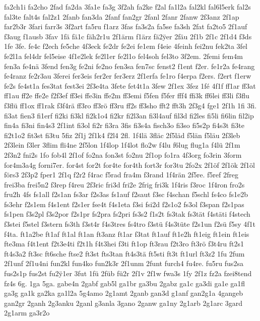 {fa2ch1i
fa2cho
2fad
fa2da
3fa1e
fa3g
3f2ah
fa2ke
f2al
fa1l2a
fal2kl
fal6l5erk
fal2s
fal3te
falt4s
fal2z1
2fanb
fan3da
2fanf
fan2gr
2fanl
2fanr
2fanw
2f3anz
2f1ap
far2b3r
3fari
farr3s
3f2art
fa5ru
f1arz
3fas
fa3s2a
fa5se
fa3sh
2fat
fa2to5
2f1auf
f3aug
f1ausb
3fav
1fä
fä1c
fäh2r1u
2f1ärm
f1ärz
fä2^^ffer
2fäu
2f1b
2f1c
2f1d4
f3ds
1fe
3fe.
fe4c
f2ech
fe5che
4f3eck
fe2dr
fe2ei
fe1em
f4eie
4feinh
fei2nu
fek2ta
3fel
fe2l1a
fel4dr
fel5eise
4f1e2lek
fe2l1er
fe2l1o
fel4soh
fel3to
3f2em.
2femi
fem4m
fen3a
fe4nä
3fend
fen3g
fe2ni
fe2no
fen3sa
fen7sc
fenst2
f1ent
f2er.
fe1r2a
fe4rang
fe4ranz
fe2r3au
3ferei
fer3eis
fer2er
fer3erz
2f1erfa
fe1ro
f4erpa
f2ers.
f2ert
f1erw
fe2s
fe4st1a
fes3tat
fest3ei
2f3e4ta
3fete
fet4t1a
3few
2f1ex
3fez
1fé
4f1f
ff1ar
ff3at
ff1au
ff2e
ffe2e
f2f3ef
ff3ei
ffe3in
ffe2m
ff3emi
f5fen
f5fer
fff4
ffi3k
ff6lei
ff3li
f3flu
f3flü
ff1ox
ff1rak
f3f4rä
ff3ro
ff3rö
ff3ru
ff2s
ff3sho
fft2
fft3h
2f3g4
fge1
2f1h
1fi
3fi.
fi3at
fien3
fi1erf
fi2ki
fi3kl
fi2k1o4
fi2kr
fi2l3an
fi3l4auf
fil3d
fi2les
fi5li
fi6lin
fil2ip
fin4a
fi3ni
fin4s3
2f1int
fi3ol
fi2r
fi3ra
3fis
fi3s4a
fisch3o
fi3so
fi5s2p
fi4s3t
fi3te
fi2t1o2
fit3st
fi3tu
5fiz
2f1j
2f1k4
f2l4
2fl.
1f4lä
3fläc
2f5läd
f5län
f5läu
2f3leb
2f3lein
f3ler
3flim
fli4ne
2f5lon
1f4lop
1f4lot
flo2w
f4lu
f6lug
flug1a
f4lü
2f1m
2f3n2
fni2s
1fo
fob4l
2f1of
fo2na
fon3st
fo2nu
2f1op
fo1ra
4f3org
fo3rin
3form
for4m3a4g
forni7er.
for4st
for2t
for4te
for4th
fort3r
for3tu
2fo2x
2f1öf
2f1ök
2f1öl
förs3
2f3p2
fper1
2f1q
f2r2
f4rac
f5rad
fra4m
f3rand
1f4rän
2f5re.
f5ref
2freg
frei3ba
frei5n2
f3rep
f4reu
2f3ric
fri3d
fri2e
2frig
fri3k
1f4ris
f3roc
1f4ron
fro2s
fru2h
4fs
fs1all
f2s1an
fs3ar
f2s3as
fs1auf
f2saut
f3sc
f4schan
f5schl
fs4co
fs1e2b
fs3ehr
f2s1em
f4s1ent
f2s1er
fse4t
f4s1eta
f3si
fsi2d
f2s1o2
fs3ol
f3span
f2s1pas
fs1pen
f3s2pl
f3s2por
f2s1pr
fs2pra
fs2pri
fs3s2
f1s2t
fs3tak
fs3tät
f4stäti
f4stech
f3stei
f5stel
f3stern
fs3th
f3st4r
f4s3tres
fs4tro
f3stü
f4s3tüte
f2s1un
f2sü
f5sy
4f1t
f4ta.
ft1a2be
ft1af
ft1al
ft1an
ft3anz
ft1ar
f3tat
ft1auf
ft1e2h
ft1eig
ft1ein
ft1eis
fte3ma
f4t1ent
f2t3e4ti
f2t1h
f4t3hei
f3ti
ft1op
ft3rau
f2t3ro
ft3rö
f3t4ru
ft2s1
ft4s3a2
ft3sc
ft6sche
ftse2
ft3st
fts3tan
ft4s3tä
ft5sti
ft3t
ft1url
ft3z2
1fu
2fum
2f1unf
2f1u4ni
fun2kl
fun4ko
fun2k3r
2f1unm
2funt
furch4
fu4re.
fu5ru
fus2sa
fus2s1p
fus2st
fu2^^ff1er
3fut
1fü
2füb
fü2r
2f1v
2f1w
fwa3s
1fy
2f1z
fz2a
fzei8tend
fz4s
6g.
1ga
5ga.
gabe4n
2gabf
gab5l
ga1br
ga3bu
2gabz
ga1c
ga3di
ga1e
ga1fl
ga3g
ga1k
ga2ka
ga1l2a
5g4amo
2g1amt
2ganb
gan3d
g1anf
gan2g1a
4gangeb
gan2gr
2ganh
2g3anku
2ganl
g3anla
3gano
2ganw
ga1ny
2g1arb
2g1arc
3gard
2g1arm
ga3r2o
}
